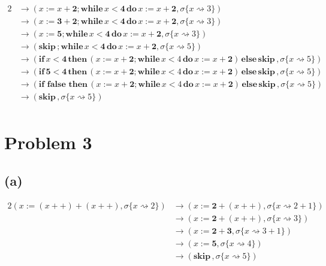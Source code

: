 \documentclass[a4papers]{ctexart}
\begin{document}
\begin{alignat*}{2}
    &\rightarrow ( x:=x+  \mathbf{2};\mathbf{while}\,  x<\mathbf{4} \, \mathbf{do}\, x:=x+  \mathbf{2},\sigma\{x \rightsquigarrow 3 \})\\
    &\rightarrow ( x:=  \mathbf{3}+  \mathbf{2};\mathbf{while}\,  x<\mathbf{4} \, \mathbf{do}\, x:=x+  \mathbf{2},\sigma\{x \rightsquigarrow 3 \})\\
    &\rightarrow ( x:=\mathbf{5};\mathbf{while}\,  x<\mathbf{4} \, \mathbf{do}\, x:=x+  \mathbf{2},\sigma\{x \rightsquigarrow 3 \})\\
    &\rightarrow (\mathbf{skip}\, ;\mathbf{while}\,  x<\mathbf{4} \, \mathbf{do}\, x:=x+  \mathbf{2},\sigma\{x \rightsquigarrow 5 \})\\
    &\rightarrow (  \mathbf{if}\,  x <\mathbf{4}  \, \mathbf{then}\,  (x:=x+  \mathbf{2};\mathbf{while}\,  x<4 \, \mathbf{do}\, x:=x+  \mathbf{2})\, \mathbf{else}\,  \mathbf{skip}\, ,\sigma\{x \rightsquigarrow 5 \})\\
    &\rightarrow (  \mathbf{if}\,  \mathbf{5} <\mathbf{4}  \, \mathbf{then}\,  (x:=x+  \mathbf{2};\mathbf{while}\,  x<4 \, \mathbf{do}\, x:=x+  \mathbf{2})\, \mathbf{else}\,  \mathbf{skip}\, ,\sigma\{x \rightsquigarrow 5 \})\\
    &\rightarrow (  \mathbf{if}\,   \, \mathbf{false}\,   \, \mathbf{then}\,  (x:=x+  \mathbf{2};\mathbf{while}\,  x<4 \, \mathbf{do}\, x:=x+  \mathbf{2})\, \mathbf{else}\,  \mathbf{skip}\, ,\sigma\{x \rightsquigarrow 5 \})\\
    &\rightarrow (\mathbf{skip}\, ,\sigma\{x \rightsquigarrow 5 \})\\
\end{alignat*}


\section{Problem 3}
\subsection{(a)}
\begin{alignat*}{2}
    (x:=(x++)+(x++),\sigma\{x \rightsquigarrow 2 \})
    &\rightarrow (x:=  \mathbf{2}+(x++),\sigma\{x \rightsquigarrow 2+1 \})\\
    &\rightarrow (x:=  \mathbf{2}+(x++),\sigma\{x \rightsquigarrow 3 \})\\
    &\rightarrow (x:=  \mathbf{2}+  \mathbf{3},\sigma\{x \rightsquigarrow 3+1 \})\\
    &\rightarrow (x:=\mathbf{5},\sigma\{x \rightsquigarrow 4 \})\\
    &\rightarrow (\mathbf{skip}\, ,\sigma\{x \rightsquigarrow 5 \})\\
\end{alignat*}
\end{document}
